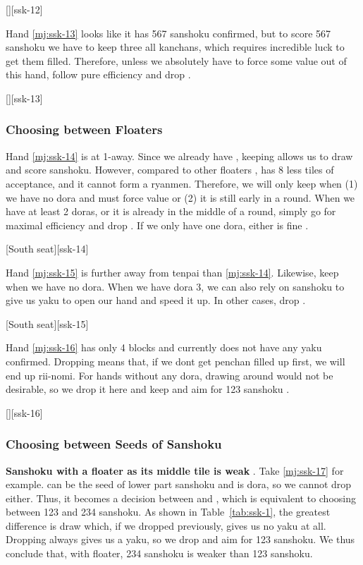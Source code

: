 \documentclass[12pt]{article}
\begin{document}
[][ssk-12]

Hand \ref{mj:ssk-13} looks like it has 567 sanshoku confirmed, but to score 567 sanshoku we have to keep three all kanchans, which requires incredible luck to get them filled. Therefore, unless we absolutely have to force some value out of this hand, follow pure efficiency and drop  \citep{gendai-ssk}.

[][ssk-13]


\subsubsection*{Choosing between Floaters}

Hand \ref{mj:ssk-14} is at 1-away. Since we already have , keeping  allows us to draw  and score sanshoku. However, compared to other floaters ,  has 8 less tiles of acceptance, and it cannot form a ryanmen. Therefore, we will only keep  when (1) we have no dora and must force value or (2) it is still early in a round. When we have at least 2 doras, or it is already in the middle of a round, simply go for maximal efficiency and drop . If we only have one dora, either is fine \citep{yoteru-ssk}.

[South seat][ssk-14]

Hand \ref{mj:ssk-15} is further away from tenpai than \ref{mj:ssk-14}. Likewise, keep  when we have no dora. When we have dora 3, we can also rely on sanshoku to give us yaku to open our hand and speed it up. In other cases, drop  \citep{yoteru-ssk}.

[South seat][ssk-15]

Hand \ref{mj:ssk-16} has only 4 blocks and currently does not have any yaku confirmed. Dropping  means that, if we dont get  penchan filled up first, we will end up rii-nomi. For hands without any dora, drawing around  would not be desirable, so we drop it here and keep  and aim for 123 sanshoku \citep{gendai-ssk}.

[][ssk-16]


\subsubsection*{Choosing between Seeds of Sanshoku}

\textbf{Sanshoku with a floater as its middle tile is weak} \citep[][pp.~65--66]{zero-teyaku}. Take \ref{mj:ssk-17} for example.  can be the seed of lower part sanshoku and  is dora, so we cannot drop either. Thus, it becomes a decision between  and , which is equivalent to choosing between 123 and 234 sanshoku. As shown in Table~\ref{tab:ssk-1}, the greatest difference is  draw which, if we dropped  previously, gives us no yaku at all. Dropping  always gives us a yaku, so we drop  and aim for 123 sanshoku. We thus conclude that, with  floater, 234 sanshoku is weaker than 123 sanshoku.
\end{document}
